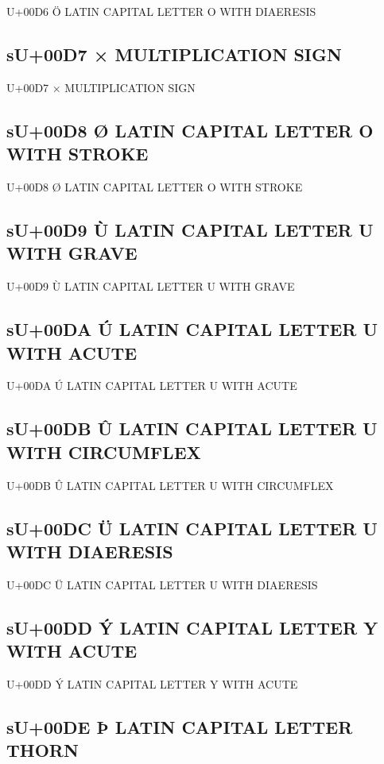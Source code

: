 U+00D6 Ö  LATIN CAPITAL LETTER O WITH DIAERESIS

\subsection{sU+00D7 ×  MULTIPLICATION SIGN}

U+00D7 ×  MULTIPLICATION SIGN

\subsection{sU+00D8 Ø  LATIN CAPITAL LETTER O WITH STROKE}

U+00D8 Ø  LATIN CAPITAL LETTER O WITH STROKE

\subsection{sU+00D9 Ù  LATIN CAPITAL LETTER U WITH GRAVE}

U+00D9 Ù  LATIN CAPITAL LETTER U WITH GRAVE

\subsection{sU+00DA Ú  LATIN CAPITAL LETTER U WITH ACUTE}

U+00DA Ú  LATIN CAPITAL LETTER U WITH ACUTE

\subsection{sU+00DB Û  LATIN CAPITAL LETTER U WITH CIRCUMFLEX}

U+00DB Û  LATIN CAPITAL LETTER U WITH CIRCUMFLEX

\subsection{sU+00DC Ü  LATIN CAPITAL LETTER U WITH DIAERESIS}

U+00DC Ü  LATIN CAPITAL LETTER U WITH DIAERESIS

\subsection{sU+00DD Ý  LATIN CAPITAL LETTER Y WITH ACUTE}

U+00DD Ý  LATIN CAPITAL LETTER Y WITH ACUTE

\subsection{sU+00DE Þ  LATIN CAPITAL LETTER THORN}

